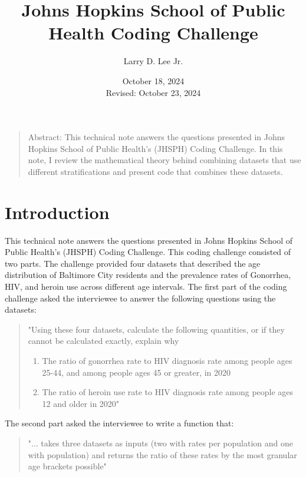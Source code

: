\documentclass[]{article}
\title{Johns Hopkins School of Public Health Coding Challenge}
\author{Larry D. Lee Jr.}
\date{October 18, 2024\\Revised: October 23, 2024}
\begin{document}
\maketitle

\begin{quote}
Abstract: This technical note answers the questions presented in Johns
Hopkins School of Public Health's (JHSPH) Coding Challenge. In this
note, I review the mathematical theory behind combining datasets that
use different stratifications and present code that combines these
datasets.
\end{quote}

\hypertarget{introduction}{%
\section{Introduction}\label{introduction}}

This technical note answers the questions presented in Johns Hopkins
School of Public Health's (JHSPH) Coding Challenge. This coding
challenge consisted of two parts. The challenge provided four datasets
that described the age distribution of Baltimore City residents and the
prevalence rates of Gonorrhea, HIV, and heroin use across different age
intervals. The first part of the coding challenge asked the interviewee
to answer the following questions using the datasets:

\begin{quote}
"Using these four datasets, calculate the following quantities, or if
they cannot be calculated exactly, explain why

\begin{enumerate}
\def\labelenumi{\arabic{enumi}.}
\item
  The ratio of gonorrhea rate to HIV diagnosis rate among people ages
  25-44, and among people ages 45 or greater, in 2020
\item
  The ratio of heroin use rate to HIV diagnosis rate among people ages
  12 and older in 2020"
\end{enumerate}
\end{quote}

The second part asked the interviewee to write a function that:

\begin{quote}
"... takes three datasets as inputs (two with rates per population and
one with population) and returns the ratio of these rates by the most
granular age brackets possible"
\end{quote}
\end{document}
